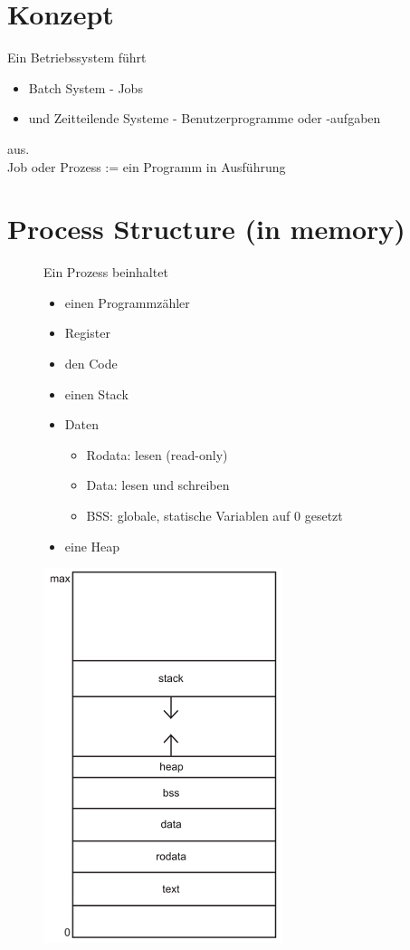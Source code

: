 \documentclass[a4paper]{scrreprt}
\begin{document}
\section{Konzept}
	Ein Betriebssystem führt
	\begin{itemize}
		\item Batch System - Jobs
		\item und Zeitteilende Systeme - Benutzerprogramme oder -aufgaben
	\end{itemize} 
	aus.\\
	Job oder Prozess := ein Programm in Ausführung
\section{Process Structure (in memory)}
	\begin{figure}[htbp]
		\begin{minipage}[t]{10cm}
			\vspace{0pt}
			Ein Prozess beinhaltet
			\begin{itemize}
				\item einen Programmzähler
				\item Register
				\item den Code
				\item einen Stack
				\item Daten
				\begin{itemize}
					\item Rodata: lesen (read-only)
					\item Data: lesen und schreiben
					\item BSS: globale, statische Variablen auf 0 gesetzt
				\end{itemize}
				\item eine Heap
			\end{itemize}
		\end{minipage}
		\hfill
		\begin{minipage}[t]{4cm}
			\vspace{0pt}
			\centering
			\includegraphics[scale = 0.3]{graphics/memory.png}\\
		\end{minipage}
	\end{figure}
\end{document}
